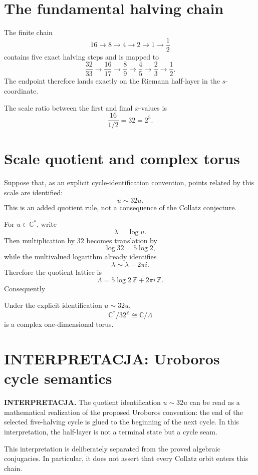 \section{The fundamental halving chain}

The finite chain
\[
16\to8\to4\to2\to1\to\frac12
\]
contains five exact halving steps and is mapped to
\[
\frac{32}{33}\to\frac{16}{17}\to\frac89\to\frac45\to\frac23\to\frac12.
\]
The endpoint therefore lands exactly on the Riemann half-layer in the $s$-coordinate.

The scale ratio between the first and final $x$-values is
\[
\frac{16}{1/2}=32=2^5.
\]

\section{Scale quotient and complex torus}

Suppose that, as an explicit cycle-identification convention, points related by this scale are identified:
\[
\boxed{u\sim32u.}
\]
This is an added quotient rule, not a consequence of the Collatz conjecture.

For $u\in\mathbb C^*$, write
\[
\lambda=\log u.
\]
Then multiplication by $32$ becomes translation by
\[
\log32=5\log2,
\]
while the multivalued logarithm already identifies
\[
\lambda\sim\lambda+2\pi i.
\]
Therefore the quotient lattice is
\[
\boxed{\Lambda=5\log2\,\mathbb Z+2\pi i\,\mathbb Z.}
\]
Consequently
\begin{theorem}
Under the explicit identification $u\sim32u$,
\[
\boxed{\mathbb C^*/32^{\mathbb Z}\cong\mathbb C/\Lambda}
\]
is a complex one-dimensional torus.
\end{theorem}

\section{INTERPRETACJA: Uroboros cycle semantics}

\textbf{INTERPRETACJA.} The quotient identification $u\sim32u$ can be read as a mathematical realization of the proposed Uroboros convention: the end of the selected five-halving cycle is glued to the beginning of the next cycle. In this interpretation, the half-layer is not a terminal state but a cycle seam.

This interpretation is deliberately separated from the proved algebraic conjugacies. In particular, it does not assert that every Collatz orbit enters this chain.

